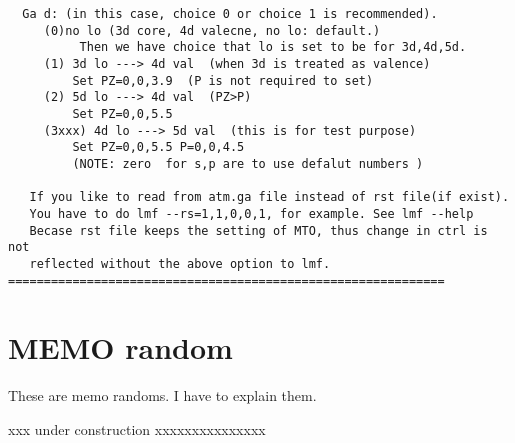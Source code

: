 \documentclass[a4paper,10pt,epsf,fleqn]{article}
\begin{document}
\begin{verbatim}
  Ga d: (in this case, choice 0 or choice 1 is recommended).
     (0)no lo (3d core, 4d valecne, no lo: default.)
          Then we have choice that lo is set to be for 3d,4d,5d.
     (1) 3d lo ---> 4d val  (when 3d is treated as valence)
         Set PZ=0,0,3.9  (P is not required to set)
     (2) 5d lo ---> 4d val  (PZ>P)
         Set PZ=0,0,5.5
     (3xxx) 4d lo ---> 5d val  (this is for test purpose)
         Set PZ=0,0,5.5 P=0,0,4.5
         (NOTE: zero  for s,p are to use defalut numbers )

   If you like to read from atm.ga file instead of rst file(if exist).
   You have to do lmf --rs=1,1,0,0,1, for example. See lmf --help
   Becase rst file keeps the setting of MTO, thus change in ctrl is not
   reflected without the above option to lmf.
=============================================================
\end{verbatim}


\section{ MEMO random}
These are memo randoms. 
I have to explain them.

xxx under construction xxxxxxxxxxxxxxx
\end{document}
